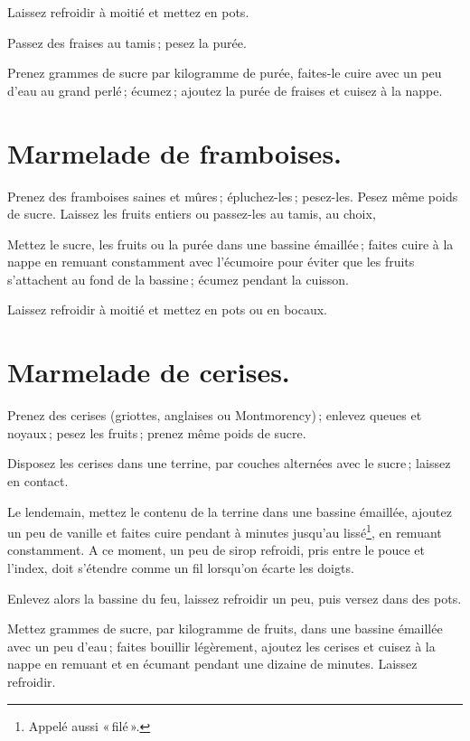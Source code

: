 Laissez refroidir à moitié et mettez en pots.

\sk

Passez des fraises au tamis ; pesez la purée.

Prenez {\mmm} grammes de sucre par kilogramme de purée, faites-le cuire
avec un peu d'eau au grand perlé ; écumez ; ajoutez la purée de fraises et
cuisez à la nappe.

\section*{\centering Marmelade de framboises.}
{}

Prenez des framboises saines et mûres ; épluchez-les ; pesez-les. Pesez même poids
de sucre. Laissez les fruits entiers ou passez-les au tamis, au choix,

Mettez le sucre, les fruits ou la purée dans une bassine émaillée ; faites cuire
à la nappe en remuant constamment avec l'écumoire pour éviter que les fruits
s’attachent au fond de la bassine ; écumez pendant la cuisson.

Laissez refroidir à moitié et mettez en pots ou en bocaux.

\section*{\centering Marmelade de cerises.}
{}

Prenez des cerises (griottes, anglaises ou Montmorency) ; enlevez queues et
noyaux ; pesez les fruits ; prenez même poids de sucre.

Disposez les cerises dans une terrine, par couches alternées avec le sucre ;
laissez en contact.

Le lendemain, mettez le contenu de la terrine dans une bassine émaillée,
ajoutez un peu de vanille et faites cuire pendant {\mmm} à {\mmm}
minutes jusqu'au lissé\footnote{Appelé aussi « filé ».}, en remuant
constamment. A ce moment, un peu de sirop refroidi, pris entre le pouce et
l'index, doit s'étendre comme un fil lorsqu'on écarte les doigts.

Enlevez alors la bassine du feu, laissez refroidir un peu, puis versez dans des
pots.

\sk

Mettez {\mmm} grammes de sucre, par kilogramme de fruits, dans une
bassine émaillée avec un peu d'eau ; faites bouillir légèrement, ajoutez les
cerises et cuisez à la nappe en remuant et en écumant pendant une dizaine de
minutes. Laissez refroidir.

